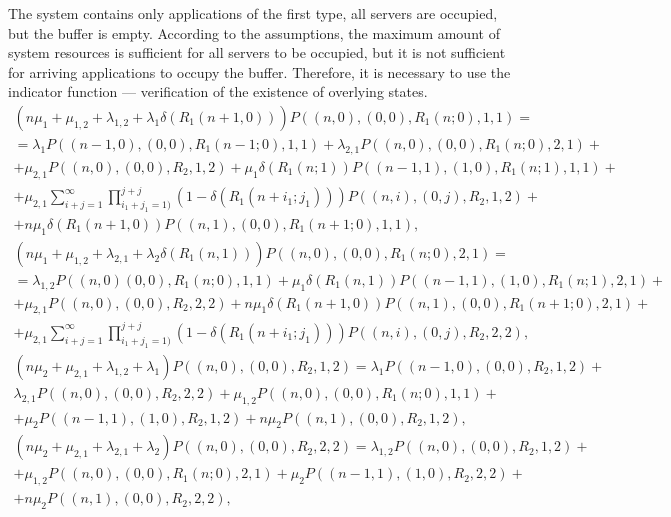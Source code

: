\documentclass[default]{subfiles}
\begin{document}
{The system contains only applications of the first type, all servers
are occupied, but the buffer is empty. According to the assumptions,
the maximum amount of system resources is sufficient for all servers
to be occupied, but it is not sufficient for arriving applications to
occupy the buffer. Therefore, it is necessary to use the indicator
function --- verification of the existence of overlying states.
\begin{multline}
  \left(n\mu_1+\mu_{1,2}+\lambda_{1,2}+\lambda_1 \delta\left(R_1
      (n+1,0)\right)\right) P\left((n,0),(0,0),R_1 (n;0),1,1\right) =
  \\ = \lambda_1 P\left((n-1,0),(0,0),R_1
    (n-1;0),1,1\right)+\lambda_{2,1} P\left((n,0),(0,0),R_1
    (n;0),2,1\right)+ \\ + \mu_{2,1}
  P\left((n,0),(0,0),R_2,1,2\right)+\mu_1 \delta\left(R_1 (n;1)\right)
  P\left((n-1,1),(1,0),R_1 (n;1),1,1\right)+\\ + \mu_{2,1}
  \sum\limits_{i+j=1}^{\infty}\prod\limits_{i_1+j_1=1)}^{j+j}\left(1-\delta\left(R_1
      (n+i_1;j_1) \right)\right) P\left((n,i),(0,j),R_2,1,2\right)+ \\
  + n\mu_1 \delta\left(R_1 (n+1,0)\right) P\left((n,1),(0,0),R_1
    (n+1;0),1,1\right),
\label{eq:3.1}
\end{multline}
\begin{multline}
  \left(n\mu_1+\mu_{1,2}+\lambda_{2,1}+\lambda_2 \delta\left(R_1
      (n,1)\right)\right) P\left((n,0),(0,0),R_1 (n;0),2,1\right) = \\
  = \lambda_{1,2} P\left((n,0)(0,0),R_1 (n;0),1,1\right)+ \mu_1
  \delta\left(R_1 (n,1)\right) P\left((n-1,1),(1,0),R_1
    (n;1),2,1\right)+\\ + \mu_{2,1} P\left((n,0),(0,0),R_2,2,2\right)+
  n\mu_1 \delta\left(R_1 (n+1,0)\right) P\left((n,1),(0,0), R_1
    (n+1;0),2,1\right)+ \\ + \mu_{2,1}
  \sum\limits_{i+j=1}^{\infty}\prod\limits_{i_1+j_1=1)}^{j+j}\left(1-\delta\left(R_1
      (n+i_1;j_1) \right)\right) P\left((n,i),(0,j),R_2,2,2\right),
\label{eq:3.2}
\end{multline}
\begin{multline}
  \left(n\mu_2+\mu_{2,1}+\lambda_{1,2}+\lambda_1 \right)
  P\left((n,0),(0,0),R_2,1,2\right) =
  \lambda_1 P\left((n-1,0),(0,0),R_2,1,2\right)+\\
  \lambda_{2,1} P\left((n,0),(0,0),R_2,2,2\right)+ \mu_{1,2}
  P\left((n,0),(0,0), R_1(n;0),1,1\right)+\\ + \mu_2
  P\left((n-1,1),(1,0),R_2,1,2\right)+ n\mu_2 P\left((n,1),(0,0),
    R_2,1,2\right),
\label{eq:3.3}
\end{multline}
\begin{multline}
  \left(n\mu_2+\mu_{2,1}+\lambda_{2,1}+\lambda_2\right)
  P\left((n,0),(0,0),R_2,2,2\right) = \lambda_{1,2}
  P\left((n,0),(0,0),R_2,1,2\right)+ \\ + \mu_{1,2}
  P\left((n,0),(0,0),R_1(n;0),2,1\right)+\mu_2
  P\left((n-1,1),(1,0),R_2,2,2\right)+\\ + n\mu_2 P\left((n,1),(0,0),
    R_2,2,2\right),
\label{eq:3.4}
\end{multline}

}
\end{document}
